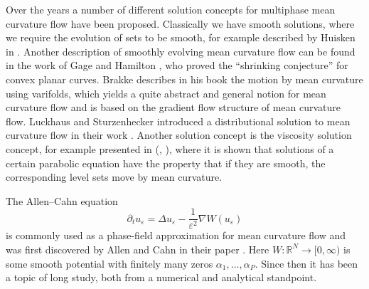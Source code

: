 Over the years a number of different solution concepts for multiphase mean 
curvature flow have been proposed. Classically we have smooth solutions, where 
we require the evolution of sets to be smooth, for example described by Huisken 
in \cite{huisken_asymptotic_behavior_for_singuliarities_of_mcf}. 
Another description of smoothly evolving mean curvature flow can be found in 
the work of Gage and Hamilton 
\cite{gage_hamilton_the_heat_equation_shrinking_convex_plane_curves}, who 
proved the \enquote{shrinking conjecture} for convex planar curves.
Brakke describes in his book 
\cite{brakke_kenneth_motion_of_surface_by_mean_curvature} the motion by mean 
curvature using varifolds, which yields a quite abstract and general notion for 
mean curvature flow and is based on the gradient flow structure of mean 
curvature flow. 
Luckhaus and Sturzenhecker introduced a 
distributional solution to mean curvature flow in their work 
\cite{luckhaus_sturzenhecker_implicit_time_discretization_for_mcf}. Another 
solution concept is the viscosity solution concept, for example presented in 
(\cite{chen_giga_goto_uniqueness_and_existence_of_generalized_mcf_equations},
\cite{evans_spruck_motion_of_level_sets_by_mean_curvature}), where it is shown 
that solutions of a certain parabolic equation have the property that if they 
are smooth, the corresponding level sets move by mean curvature.

The Allen--Cahn equation
\begin{equation}
	\label{ac_intro}
	\partial_{ t } u_{ \varepsilon }
	=
	\Delta u_{ \varepsilon }
	-
	\frac{ 1 }{ \varepsilon^{ 2 } }
	\nabla W ( u_{ \varepsilon } )
\end{equation}
is commonly used as a phase-field approximation for mean curvature flow and was 
first discovered by Allen and Cahn in their paper 
\cite{allen_cahn_microscopig_theory_for_antiphase_boundary_motion}. Here $ W 
\colon \mathbb{ R }^{ N } \to [ 0 , \infty ) $ is some smooth potential with 
finitely many zeros $ \alpha_{ 1 } , \dotsc, \alpha_{ P } $.
Since then it has been a topic of long study, both from a numerical and 
analytical standpoint. 

